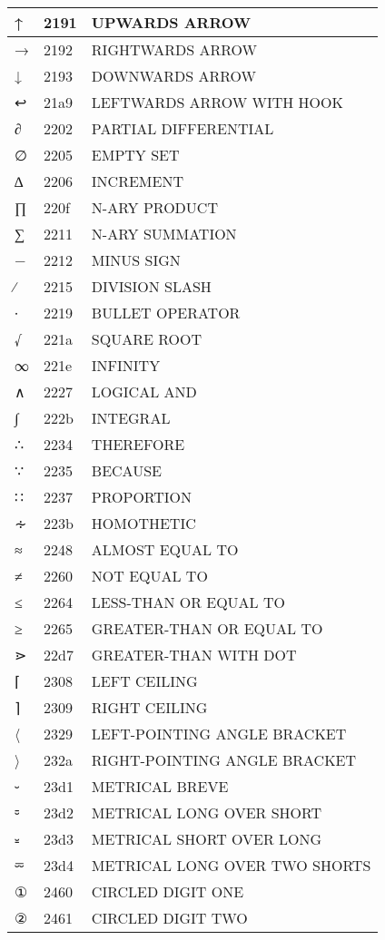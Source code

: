 \documentclass[12pt,letterpaper,openany]{book}
\begin{document}
\begin{center}
\begin{supertabular}{|m{0.25in}|m{0.5in}|m{4in}|}
↑ & 2191 & UPWARDS ARROW\\\hline
→ & 2192 & RIGHTWARDS ARROW\\\hline
↓ & 2193 & DOWNWARDS ARROW\\\hline
↩ & 21a9 & LEFTWARDS ARROW WITH HOOK\\\hline
∂ & 2202 & PARTIAL DIFFERENTIAL\\\hline
∅ & 2205 & EMPTY SET\\\hline
∆ & 2206 & INCREMENT\\\hline
∏ & 220f & N-ARY PRODUCT\\\hline
∑ & 2211 & N-ARY SUMMATION\\\hline
− & 2212 & MINUS SIGN\\\hline
∕ & 2215 & DIVISION SLASH\\\hline
∙ & 2219 & BULLET OPERATOR\\\hline
√ & 221a & SQUARE ROOT\\\hline
∞ & 221e & INFINITY\\\hline
∧ & 2227 & LOGICAL AND\\\hline
∫ & 222b & INTEGRAL\\\hline
∴ & 2234 & THEREFORE\\\hline
∵ & 2235 & BECAUSE\\\hline
∷ & 2237 & PROPORTION\\\hline
∻ & 223b & HOMOTHETIC\\\hline
≈ & 2248 & ALMOST EQUAL TO\\\hline
≠ & 2260 & NOT EQUAL TO\\\hline
≤ & 2264 & LESS-THAN OR EQUAL TO\\\hline
≥ & 2265 & GREATER-THAN OR EQUAL TO\\\hline
⋗ & 22d7 & GREATER-THAN WITH DOT\\\hline
⌈ & 2308 & LEFT CEILING\\\hline
⌉ & 2309 & RIGHT CEILING\\\hline
〈 & 2329 & LEFT-POINTING ANGLE BRACKET\\\hline
〉 & 232a & RIGHT-POINTING ANGLE BRACKET\\\hline
⏑ & 23d1 & METRICAL BREVE\\\hline
⏒ & 23d2 & METRICAL LONG OVER SHORT\\\hline
⏓ & 23d3 & METRICAL SHORT OVER LONG\\\hline
⏔ & 23d4 & METRICAL LONG OVER TWO SHORTS\\\hline
① & 2460 & CIRCLED DIGIT ONE\\\hline
② & 2461 & CIRCLED DIGIT TWO\\\hline

\end{supertabular}
\end{center}
\end{document}
